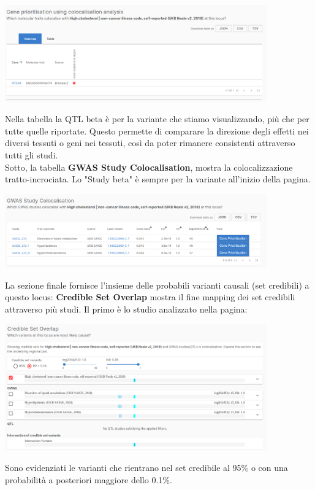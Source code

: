 \documentclass{article}
\begin{document}
\begin{center}
    \includegraphics[width=0.85\textwidth]{figures/StudyLocus3.png}
\end{center}
Nella tabella la QTL beta è per la variante che stiamo visualizzando, più che per tutte quelle riportate. Questo permette di comparare la direzione degli effetti nei diversi tessuti o geni nei tessuti, così da poter rimanere consistenti attraverso tutti gli studi.\\
Sotto, la tabella \textbf{GWAS Study Colocalisation}, mostra la colocalizzazione tratto-incrociata. Lo "Study beta" è sempre per la variante all'inizio della pagina. 
\begin{center}
    \includegraphics[width=0.85\textwidth]{figures/StudyLocus4.png}
\end{center}
La sezione finale fornisce l'insieme delle probabili varianti causali (set credibili) a questo
locus: \textbf{Credible Set Overlap} mostra il fine mapping dei set credibili attraverso più studi. Il primo è lo studio analizzato nella pagina:
\begin{center}
    \includegraphics[width=0.85\textwidth]{figures/StudyLocus5.png}
\end{center}
Sono evidenziati le varianti che rientrano nel set credibile al 95\% o con una probabilità a posteriori maggiore dello 0.1\%. \\
\end{document}

